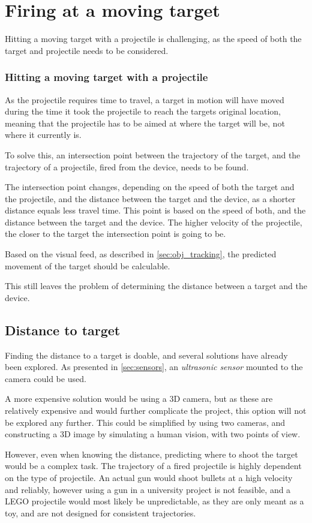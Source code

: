 \section{Firing at a moving target}
Hitting a moving target with a projectile is challenging, as the speed of both the target and projectile needs to be considered.

\subsubsection{Hitting a moving target with a projectile}
As the projectile requires time to travel, a target in motion will have moved during the time it took the projectile to reach the targets original location, meaning that the projectile has to be aimed at where the target will be, not where it currently is.


To solve this, an intersection point between the trajectory of the target, and the trajectory of a projectile, fired from the device, needs to be found.

The intersection point changes, depending on the speed of both the target and the projectile, and the distance between the target and the device, as a shorter distance equals less travel time.
This point is based on the speed of both, and the distance between the target and the device.
The higher velocity of the projectile, the closer to the target the intersection point is going to be.

Based on the visual feed, as described in \autoref{sec:obj_tracking}, the predicted movement of the target should be calculable.


This still leaves the problem of determining the distance between a target and the device.
\subsection{Distance to target}
Finding the distance to a target is doable, and several solutions have already been explored.
As presented in \autoref{sec:sensors}, an \textit{ultrasonic sensor} mounted to the camera could be used.

A more expensive solution would be using a 3D camera, but as these are relatively expensive and would further complicate the project, this option will not be explored any further.
This could be simplified by using two cameras, and constructing a 3D image by simulating a human vision, with two points of view.

However, even when knowing the distance, predicting where to shoot the target would be a complex task.
The trajectory of a fired projectile is highly dependent on the type of projectile.
An actual gun would shoot bullets at a high velocity and reliably, however using a gun in a university project is not feasible, and a LEGO projectile would most likely be unpredictable, as they are only meant as a toy, and are not designed for consistent trajectories.


